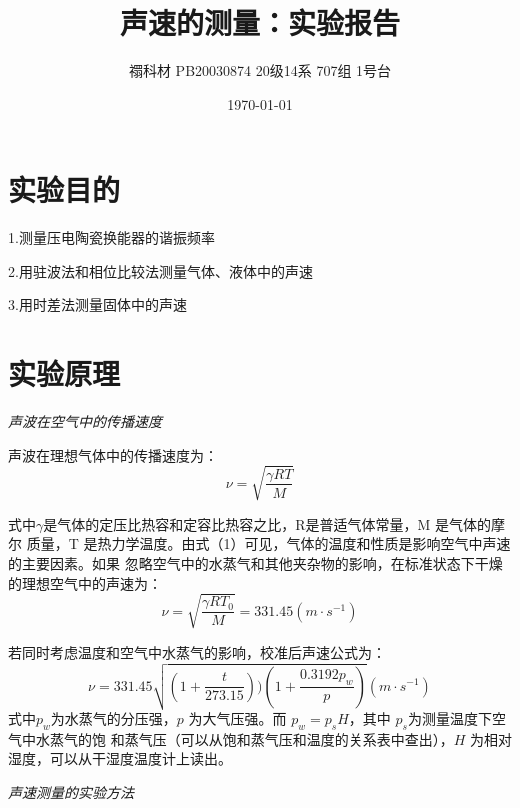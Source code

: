 \documentclass[UTF8]{ctexart}
\title{声速的测量：实验报告}
\author{禤科材 PB20030874 20级14系 707组 1号台}
\date{\today}
\begin{document}
    \maketitle

   \section{实验目的}

   \begin{center}
    1.测量压电陶瓷换能器的谐振频率

    2.用驻波法和相位比较法测量气体、液体中的声速

    3.用时差法测量固体中的声速 
   \end{center}

    \section{实验原理}

    \begin{center}
        \emph{声波在空气中的传播速度}\\[0.4cm]
    \end{center}

    声波在理想气体中的传播速度为：
    \begin{equation}
        \nu =\sqrt{\frac{\gamma RT}{M}}
    \end{equation}

    式中$\gamma $是气体的定压比热容和定容比热容之比，R是普适气体常量，M 是气体的摩尔
    质量，T 是热力学温度。由式（1）可见，气体的温度和性质是影响空气中声速的主要因素。如果
    忽略空气中的水蒸气和其他夹杂物的影响，在标准状态下干燥的理想空气中的声速为：
    \begin{equation*}
        \nu =\sqrt{\frac{\gamma RT_0}{M}}=331.45(m·s^{-1})
    \end{equation*}

    若同时考虑温度和空气中水蒸气的影响，校准后声速公式为：
    \begin{equation}
        \nu =331.45\sqrt{(1+\frac{t}{273.15}))(1+\frac{0.3192p_w}{p})}(m·s^{-1})
    \end{equation}
    式中$p_w$为水蒸气的分压强，$p$ 为大气压强。而 $p_w=p_sH$，其中 $p_s$为测量温度下空气中水蒸气的饱
    和蒸气压（可以从饱和蒸气压和温度的关系表中查出），$H$ 为相对湿度，可以从干湿度温度计上读出。

    \begin{center}
        \emph{声速测量的实验方法}\\[0.4cm]
    \end{center}
\end{document}
